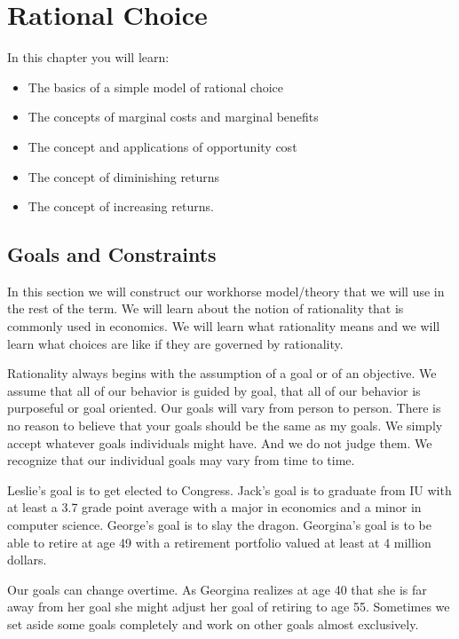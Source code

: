 \documentclass[
]{book}
\providecommand{\tightlist}{%
  \setlength{\itemsep}{0pt}\setlength{\parskip}{0pt}}
\begin{document}
\hypertarget{rational-choice}{%
\chapter{Rational Choice}\label{rational-choice}}

In this chapter you will learn:

\begin{itemize}
\tightlist
\item
  The basics of a simple model of rational choice
\item
  The concepts of marginal costs and marginal benefits
\item
  The concept and applications of opportunity cost
\item
  The concept of diminishing returns
\item
  The concept of increasing returns.
\end{itemize}

\hypertarget{goals-and-constraints}{%
\section{Goals and Constraints}\label{goals-and-constraints}}

In this section we will construct our workhorse model/theory that we will use in the rest of the term. We will learn about the notion of rationality that is commonly used in economics. We will learn what rationality means and we will learn what choices are like if they are governed by rationality.

Rationality always begins with the assumption of a goal or of an objective. We assume that all of our behavior is guided by goal, that all of our behavior is purposeful or goal oriented. Our goals will vary from person to person. There is no reason to believe that your goals should be the same as my goals. We simply accept whatever goals individuals might have. And we do not judge them. We recognize that our individual goals may vary from time to time.

Leslie's goal is to get elected to Congress. Jack's goal is to graduate from IU with at least a 3.7 grade point average with a major in economics and a minor in computer science. George's goal is to slay the dragon. Georgina's goal is to be able to retire at age 49 with a retirement portfolio valued at least at 4 million dollars.

Our goals can change overtime. As Georgina realizes at age 40 that she is far away from her goal she might adjust her goal of retiring to age 55. Sometimes we set aside some goals completely and work on other goals almost exclusively.
\end{document}
